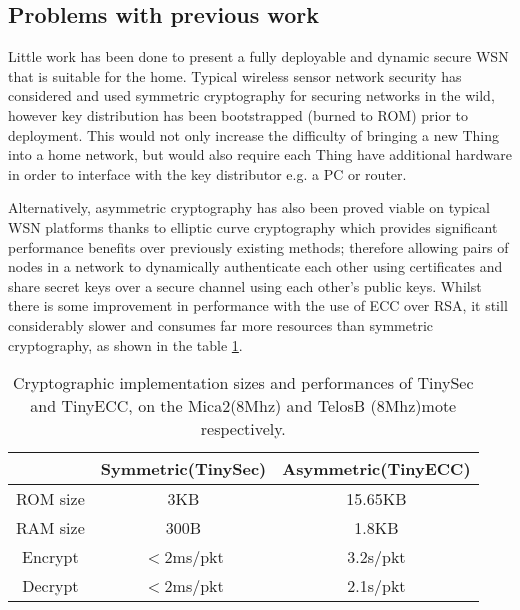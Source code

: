 \documentclass{mprop}
\begin{document}
\subsection{Problems with previous work} %
\label{sub:problems_with_previous_work}

Little work has been done to present a fully deployable and dynamic secure WSN that is suitable for the home. Typical wireless sensor network security has considered and used symmetric cryptography\cite{TinySec,MiniSec, ContikiSec} for securing networks in the wild, however key distribution has been bootstrapped (burned to ROM) prior to deployment. This would not only increase the difficulty of bringing a new Thing into a home network, but would also require each Thing have additional hardware in order to interface with the key distributor e.g. a PC or router. 

Alternatively, asymmetric cryptography has also been proved viable on typical WSN platforms thanks to elliptic curve cryptography which provides significant performance benefits over previously existing methods\cite{TinyECC}; therefore allowing pairs of nodes in a network to dynamically authenticate each other using certificates and share secret keys over a secure channel using each other's public keys. Whilst there is some improvement in performance with the use of ECC over RSA, it still considerably slower and consumes far more resources than symmetric cryptography, as shown in the table \ref{tab:crypto_compare}.

\begin{table}[h] %
  \begin{center} 
  \begin{tabular}{|c|c|c|} 
  \hline
           & Symmetric(TinySec) & Asymmetric(TinyECC) \\ \hline
  ROM size & 3KB                & 15.65KB \\ \hline
  RAM size & 300B               & 1.8KB \\ \hline
  Encrypt  & $<$2ms/pkt         & 3.2s/pkt \\ \hline 
  Decrypt  & $<$2ms/pkt         & 2.1s/pkt \\ \hline
  \end{tabular}
  \caption[]{Cryptographic implementation sizes and performances of TinySec and TinyECC, on the Mica2(8Mhz) and TelosB (8Mhz)mote respectively\footnotemark. \cite{TinySec,TinyECC}}
  \label{tab:crypto_compare}
  \end{center}
\end{table}
\end{document}
